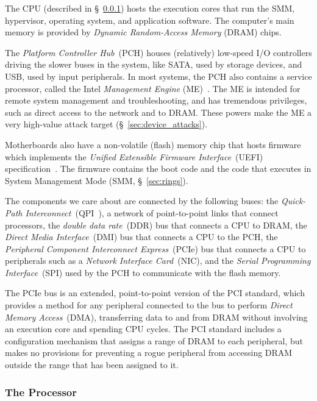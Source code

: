 The CPU (described in \S~\ref{sec:cpu_die}) hosts the execution cores that run
the SMM, hypervisor, operating system, and application software. The computer's
main memory is provided by \textit{Dynamic Random-Access Memory} (DRAM) chips.

The \textit{Platform Controller Hub}~(PCH) houses (relatively) low-speed I/O
controllers driving the slower buses in the system, like SATA, used by storage
devices, and USB, used by input peripherals. In most systems, the PCH also
contains a service processor, called the Intel \textit{Management Engine}
(ME)~\cite{ruan2014intelme, ververis2010security}. The ME is intended for
remote system management and troubleshooting, and has tremendous privileges,
such as direct access to the network and to DRAM. These powers make the ME a
very high-value attack target (\S~\ref{sec:device_attacks}).

Motherboards also have a non-volatile (flash) memory chip that hosts firmware
which implements the \textit{Unified Extensible Firmware Interface}~(UEFI)
specification~\cite{forum2015uefi}. The firmware contains the boot code and the
code that executes in System Management Mode (SMM, \S~\ref{sec:rings}).

The components we care about are connected by the following buses: the
\textit{Quick-Path Interconnect}~(QPI~\cite{intel2009qpi}), a network of
point-to-point links that connect processors, the
\textit{double data rate}~(DDR) bus that connects a CPU to DRAM, the
\textit{Direct Media Interface}~(DMI) bus that connects a CPU to the PCH, the
\textit{Peripheral Component Interconnect Express}~(PCIe) bus that connects
a CPU to peripherals such as a \textit{Network Interface Card}~(NIC), and the
\textit {Serial Programming Interface}~(SPI) used by the PCH to communicate
with the flash memory.

The PCIe bus is an extended, point-to-point version of the PCI standard, which
provides a method for any peripheral connected to the bus to perform
\textit{Direct Memory Access}~(DMA), transferring data to and from DRAM without
involving an execution core and spending CPU cycles. The PCI standard includes
a configuration mechanism that assigns a range of DRAM to each peripheral, but
makes no provisions for preventing a rogue peripheral from accessing DRAM
outside the range that has been assigned to it.


\subsubsection{The Processor}
\label{sec:cpu_die}

